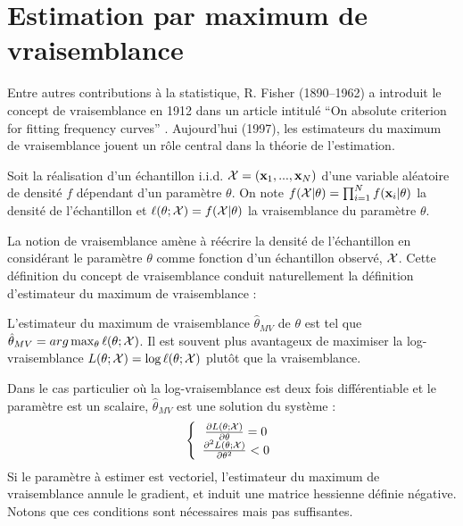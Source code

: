 \section{Estimation par maximum de vraisemblance}

Entre autres contributions \`a la statistique, R. Fisher (1890--1962) a
introduit le concept de vraisemblance en 1912 dans un article intitul\'e
``On absolute criterion for fitting frequency curves'' \cite{Fisher1912}.
Aujourd'hui (1997), les estimateurs du maximum de vraisemblance jouent un 
r\^ole central dans la th\'eorie de l'estimation.

\begin{defi}
Soit la r\'ealisation d'un \'echantillon i.i.d. ${\cal X}=(\mbox{\bf x}_1,...,\mbox{\bf x}_N)$ d'une 
variable al\'eatoire  de densit\'e  $f$ d\'ependant d'un param\`etre $\theta$. 
On note $f({\cal X} | \theta)=\prod_{i=1}^N f(\mbox{\bf x}_i | \theta)$ la densit\'e de 
l'\'echantillon et $\ell(\theta; {\cal X})=f({\cal X} | \theta)$ la vraisemblance 
du  param\`etre $\theta$.   
\end{defi}

La notion de vraisemblance am\`ene \`a r\'e\'ecrire la densit\'e de 
l'\'echantillon en consid\'erant le param\`etre $\theta$ comme fonction
d'un \'echantillon observ\'e, ${\cal X}$. Cette d\'efinition du concept de 
vraisemblance conduit naturellement la d\'efinition d'estimateur du
maximum de vraisemblance :

L'estimateur du maximum de vraisemblance $\hat{\theta}_{MV}$ de $\theta$ est
tel que $\hat{\theta}_{MV}=arg \max_{\theta}\ell(\theta;{\cal X})$.
Il est souvent plus avantageux de maximiser la log-vraisemblance $L(\theta; {\cal X})=\log \ell(\theta; {\cal X})$
plut\^ot que la vraisemblance. 

Dans le cas particulier o\`u la log-vraisemblance est deux fois diff\'erentiable et
le param\`etre est un scalaire,
$\hat{\theta}_{MV}$ est une solution du syst\`eme : 
\[
\left \{
\begin{array}{c}
\frac{\partial L(\theta; {\cal X})}{\partial \theta}=0 \\
\frac{\partial^2 L(\theta; {\cal X})}{\partial \theta^2}<0 \\
\end{array}
\right .
\]
Si le param\`etre \`a estimer est vectoriel, l'estimateur du maximum de
vraisemblance annule le gradient, et induit une matrice hessienne
d\'efinie n\'egative.  Notons que ces conditions sont  
n\'ecessaires mais pas suffisantes.


